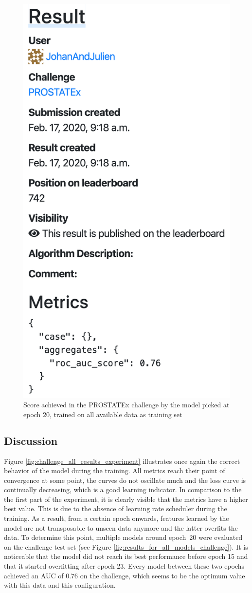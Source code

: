 \begin{figure}[!t]
\centering
\includegraphics[height=1\textwidth, keepaspectratio=true]{./figures/paper_reproduction_results_challenge2.png}
\caption{Score achieved in the PROSTATEx challenge by the model picked at epoch 20, trained on all available data as training set}
\label{fig:paper_reprodution_results_challenge2}
\end{figure}

\clearpage

\subsection{Discussion}
\setlength{\marginparwidth}{3cm}\leavevmode {}Figure \ref{fig:challenge_all_results_experiment} illustrates once again the correct behavior of the model during the training. All metrics reach their point of convergence at some point, the curves do not oscillate much and the loss curve is continually decreasing, which is a good learning indicator. In comparison to the the first part of the experiment, it is clearly visible that the metrics have a higher best value. This is due to the absence of learning rate scheduler during the training. As a result, from a certain epoch onwards, features learned by the model are not transposable to unseen data anymore and the latter overfits the data. To determine this point, multiple models around \mbox{epoch 20} were evaluated on the challenge test set (see Figure \ref{fig:results_for_all_models_challenge}). It is noticeable that the model did not reach its best performance before epoch 15 and that it started overfitting after epoch 23. Every model between these two epochs achieved an AUC of $0.76$ on the challenge, which seems to be the optimum value with this data and this configuration.

